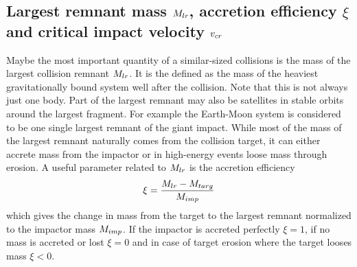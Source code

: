 \subsection{Largest remnant mass $M_{lr}$, accretion efficiency $\xi$ and critical impact velocity $v_{cr}$}
Maybe the most important quantity of a similar-sized collisions is the mass of the largest collision remnant $M_{lr}$. It is the defined as the mass of the heaviest gravitationally bound system well after the collision. Note that this is not always just one body. Part of the largest remnant may also be satellites in stable orbits around the largest fragment. For example the Earth-Moon system is considered to be one single largest remnant of the giant impact. While most of the mass of the largest remnant naturally comes from the collision target, it can either accrete mass from the impactor or in high-energy events loose mass through erosion. A useful parameter related to $M_{lr}$ is the accretion efficiency
\begin{equation}
\xi = \frac{M_{lr} - M_{targ}}{M_{imp}}
\end{equation}
which gives the change in mass from the target to the largest remnant normalized to the impactor mass $M_{imp}$. If the impactor is accreted perfectly $\xi = 1$, if no mass is accreted or lost $\xi = 0$ and in case of target erosion where the target looses mass $\xi < 0$.

